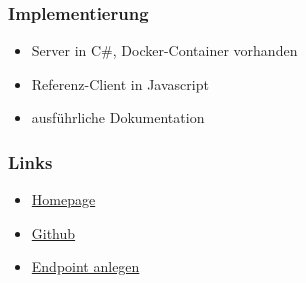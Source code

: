 \documentclass[17pt]{beamer}
\begin{document}
\begin{frame}
\frametitle{Implementierung}
\begin{itemize}
	\item Server in C\#, Docker-Container vorhanden
	\item Referenz-Client in Javascript
	\item ausführliche Dokumentation
\end{itemize}
\end{frame}
	
\begin{frame}
	\frametitle{Links}
	\begin{itemize}
		\item \href{https://www.openchain.org/}{Homepage}
		\item \href{https://github.com/openchain}{Github}
		\item \href{https://wallet.openchain.org/\#/addendpoint}{Endpoint anlegen}
	\end{itemize}
\end{frame}
\end{document}
